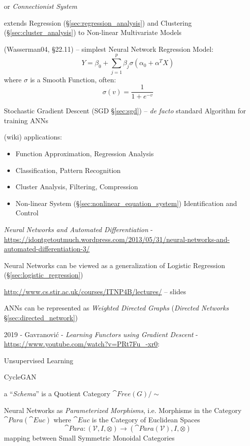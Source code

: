
or \emph{Connectionist System}

extends Regression (\S\ref{sec:regression_analysis}) and Clustering
(\S\ref{sec:cluster_analysis}) to Non-linear Multivariate Models

(Wasserman04, \S22.11) --
simplest Neural Network Regression Model:
\[
  Y = \beta_0 + \sum_{j=1}^p \beta_j \sigma (\alpha_0 + \alpha^T X)
\]
where $\sigma$ is a Smooth Function, often:
\[
  \sigma(v) = \frac{1}{1 + e^{-v}}
\]

Stochastic Gradient Descent (SGD \S\ref{sec:sgd}) -- \emph{de facto} standard
Algorithm for training ANNs

(wiki) applications:
\begin{itemize}
  \item Function Approximation, Regression Analysis
  \item Classification, Pattern Recognition
  \item Cluster Analysis, Filtering, Compression
  \item Non-linear System (\S\ref{sec:nonlinear_equation_system})
    Identification and Control
\end{itemize}

\emph{Neural Networks and Automated Differentiation} -
\url{https://idontgetoutmuch.wordpress.com/2013/05/31/neural-networks-and-automated-differentiation-3/}

Neural Networks can be viewed as a generalization of Logistic Regression
(\S\ref{sec:logistic_regression})

\asterism

\url{http://www.cs.stir.ac.uk/courses/ITNP4B/lectures/} -- slides

ANNs can be represented as \emph{Weighted Directed Graphs}
(\emph{Directed Networks} \S\ref{sec:directed_network})

\asterism

2019 - Gavranovi\'c - \emph{Learning Functors using Gradient Descent} -
\url{https://www.youtube.com/watch?v=PRt7Fu_-xr0}:

Unsupervised Learning

CycleGAN

a ``\emph{Schema}'' is a Quotient Category $\cat{Free}(G)/\sim$

Neural Networks as \emph{Parameterized Morphisms}, i.e. Morphisms in the
Category $\cat{Para}(\cat{Euc})$ where $\cat{Euc}$ is the Category of Euclidean
Spaces
\[
  \cat{Para} : (\mathcal{V}, I, \otimes)
    \rightarrow (\cat{Para}(\mathcal{V}), I, \otimes)
\]
mapping between Small Symmetric Monoidal Categories

